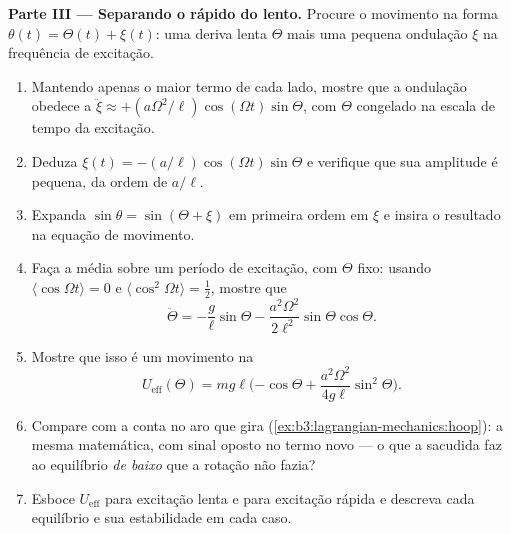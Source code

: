 \begin{problem}
\medskip\noindent\textbf{Parte III --- Separando o rápido do lento.}
Procure o movimento na forma $\theta(t) = \Theta(t) + \xi(t)$: uma
deriva lenta $\Theta$ mais uma pequena ondulação $\xi$ na frequência de
excitação.
\begin{enumerate}[resume]
  \item Mantendo apenas o maior termo de cada lado, mostre que a
        ondulação obedece a $\ddot\xi \approx +(a\Omega^2/\ell)\cos(\Omega t)
        \sin\Theta$, com $\Theta$ congelado na escala de tempo da
        excitação.
  \item Deduza $\xi(t) = -(a/\ell)\cos(\Omega t)\sin\Theta$ e verifique
        que sua amplitude é pequena, da ordem de $a/\ell$.
  \item Expanda $\sin\theta = \sin(\Theta + \xi)$ em primeira ordem em
        $\xi$ e insira o resultado na equação de movimento.
  \item Faça a média sobre um período de excitação, com $\Theta$ fixo:
        usando $\langle\cos\Omega t\rangle = 0$ e
        $\langle\cos^2\Omega t\rangle = \tfrac12$, mostre que
        \[
        \ddot\Theta = -\frac{g}{\ell}\sin\Theta
         - \frac{a^2\Omega^2}{2\ell^2}\sin\Theta\cos\Theta .
        \]
  \item Mostre que isso é um movimento na 
        \[
        U_{\text{eff}}(\Theta) = mg\ell\Big({-\cos\Theta}
         + \frac{a^2\Omega^2}{4g\ell}\sin^2\Theta\Big) .
        \]
  \item Compare com a conta no aro que gira
        (\cref{ex:b3:lagrangian-mechanics:hoop}): a mesma matemática,
        com sinal oposto no termo novo --- o que a sacudida faz ao
        equilíbrio \emph{de baixo} que a rotação não fazia?
  \item Esboce $U_{\text{eff}}$ para excitação lenta e para excitação
        rápida e descreva cada equilíbrio e sua estabilidade em cada caso.
\end{enumerate}


\end{problem}
